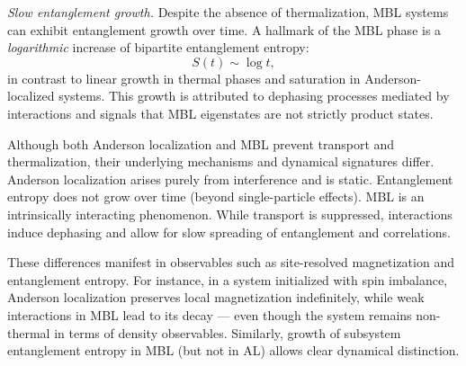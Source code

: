 \emph{Slow entanglement growth.} Despite the absence of thermalization, MBL systems can exhibit entanglement growth over time. A hallmark of the MBL phase is a \emph{logarithmic} increase of bipartite entanglement entropy:
\begin{equation*}
S(t) \sim \log t,
\end{equation*}
in contrast to linear growth in thermal phases and saturation in Anderson-localized systems. This growth is attributed to dephasing processes mediated by interactions \cite{nandkishore_many-body_2015,bardarson_unbounded_2012} and signals that MBL eigenstates are not strictly product states.



Although both Anderson localization and MBL prevent transport and thermalization, their underlying mechanisms and dynamical signatures differ. Anderson localization arises purely from interference and is static. Entanglement entropy does not grow over time (beyond single-particle effects). MBL is an intrinsically interacting phenomenon. While transport is suppressed, interactions induce dephasing and allow for slow spreading of entanglement and correlations.

These differences manifest in observables such as site-resolved magnetization and entanglement entropy. For instance, in a system initialized with spin imbalance, Anderson localization preserves local magnetization indefinitely, while weak interactions in MBL lead to its decay — even though the system remains non-thermal in terms of density observables. Similarly, growth of subsystem entanglement entropy in MBL (but not in AL) allows clear dynamical distinction.



